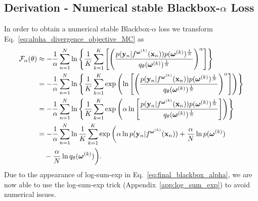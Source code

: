 \documentclass[runningheads]{llncs}
\begin{document}
\begin{subappendices}
\newpage
\section{Derivation - Numerical stable Blackbox-$\alpha$ Loss}
\label{app:blackbox_alpha_derivation}
In order to obtain a numerical stable Blackbox-$\alpha$ loss we transform Eq.~\ref{eq:alpha_divergence_objective_MC} as
\begin{align}
\mathcal{F}_\alpha (\theta) &\approx - \frac{1}{\alpha} \sum_{n =1}^N \ln \left\{ \frac{1}{K}\sum_{k=1}^K \left[ \left( \frac{p(\mathbf{y}_n| f^{\boldsymbol{\omega}^{(k)}}(\mathbf{x}_n))p(\boldsymbol{\omega}^{(k)})^\frac{1}{N}}{q_\theta(\boldsymbol{\omega}^{(k)})^\frac{1}{N}}\right)^\alpha\right]\right\}\\
&= - \frac{1}{\alpha} \sum_{n =1}^N \ln \left\{ \frac{1}{K}\sum_{k=1}^K \exp \left( \ln \left[ \left( \frac{p(\mathbf{y}_n| f^{\boldsymbol{\omega}^{(k)}}(\mathbf{x}_n))p(\boldsymbol{\omega}^{(k)})^\frac{1}{N}}{q_\theta(\boldsymbol{\omega}^{(k)})^\frac{1}{N}}\right)^\alpha\right]\right)\right\}\\
&= - \frac{1}{\alpha} \sum_{n =1}^N \ln \left\{ \frac{1}{K}\sum_{k=1}^K 
\exp \left( \alpha \ln \left[  \frac{p(\mathbf{y}_n| f^{\boldsymbol{\omega}^{(k)}}(\mathbf{x}_n))p(\boldsymbol{\omega}^{(k)})^\frac{1}{N}}{q_\theta(\boldsymbol{\omega}^{(k)})^\frac{1}{N}}\right]\right)\right\}\\
&= - \frac{1}{\alpha} \sum_{n =1}^N \ln \frac{1}{K}\sum_{k=1}^K 
\exp \bigg( \alpha \ln   
p(\mathbf{y}_n| f^{\boldsymbol{\omega}^{(k)}}(\mathbf{x}_n)) 
+  \frac{\alpha}{N}\ln p(\boldsymbol{\omega}^{(k)}) \label{eq:final_blackbox_alpha}\\ \notag &\hspace{1em}
- \frac{\alpha}{N} \ln  q_\theta(\boldsymbol{\omega}^{(k)})\bigg).
\end{align}
Due to the appearance of log-sum-exp in Eq.~\ref{eq:final_blackbox_alpha}, we are now able to use the log-sum-exp trick (Appendix~\ref{app:log_sum_exp}) to avoid numerical issues.
\end{subappendices}
\end{document}
